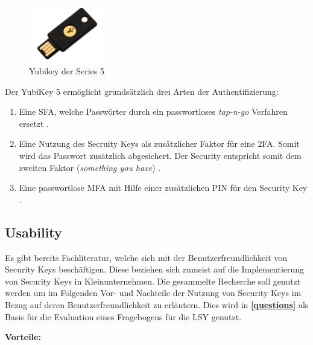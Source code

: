 \begin{figure}[h]
	\centering 
	\includegraphics[width=0.3\textwidth]{img/abbildungen/yubikey.jpeg}
	\captionsetup{format=hang}
	\caption{Yubikey der Series 5} \label{yubikey}
\end{figure}

Der YubiKey 5 ermöglicht grundsätzlich drei Arten der Authentifizierung:

\begin{enumerate}
    \item Eine \ac{SFA}, welche Passwörter durch ein passwortloses \textit{tap-n-go} Verfahren ersetzt \cite{yuibkey2023fido2}.
    \item Eine Nutzung des Secruity Keys als zusätzlicher Faktor für eine \ac{2FA}. Somit wird das Passwort zusätzlich abgesichert. Der Security entspricht somit dem zweiten Faktor (\textit{something you have}) \cite{yuibkey2023fido2}.
    \item Eine passwortlose \ac{MFA} mit Hilfe einer zusätzlichen PIN für den Security Key \cite{yuibkey2023fido2}.
\end{enumerate}

\subsection{Usability}
Es gibt bereits Fachliteratur, welche sich mit der Benutzerfreundlichkeit von Security Keys beschäftigen. Diese beziehen sich zumeist auf die Implementierung von Security Keys in Kleinunternehmen. Die gesammelte Recherche soll genutzt werden um im Folgenden Vor- und Nachteile der Nutzung von Security Keys im Bezug auf deren Benutzerfreundlichkeit zu erläutern. Dies wird in \textbf{\ref{questions}} als Basis für die Evaluation eines Fragebogens für die \ac{LSY} genutzt.

\textbf{Vorteile:}

